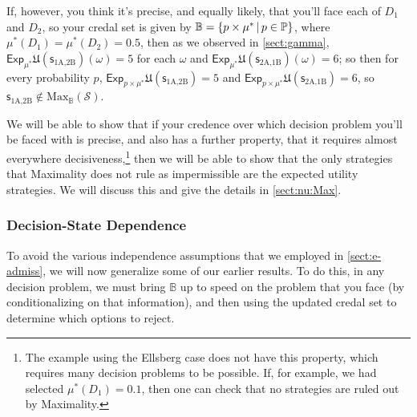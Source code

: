 \documentclass[a4paper]{article}
\newcommand\D{\mathcal{D}}
\newcommand\s{\mathsf{s}}
\renewcommand\P{\mathbb{P}} %
\newcommand\Exp{\mathsf{Exp}}
\newcommand\U{\mathfrak{U}} %
\newcommand\Maximality{\mathrm{Max}}
\newcommand{\IB}{\mathbb{B}}
\newcommand{\IP}{\P}
\renewcommand{\color}[1]{}
\newcommand{\Strategies}{\mathcal{S}}
\newcommand\SetDelimiter[1][]{
	\nonscript\,#1\vert \allowbreak \nonscript\,\mathopen{}}
\providecommand\given{\SetDelimiter}
\newenvironment{CCM rewritten}
{\begingroup\color{blue}} %
{\endgroup}              %
\begin{document}
{If, however, you think it's precise, and equally likely, that you'll face each of $D_1$ and $D_2$, so your credal set is given by $\IB=\{p\times\mu^*\given p\in\IP\}$, where $\mu^*(D_1)=\mu^*(D_2)=0.5$, then as we observed in \cref{sect:gamma}, $\Exp_{\mu^*}\U(\s_{\text{1A,2B}})(\omega)=5$ for each $\omega$ and $\Exp_{\mu^*}\U(\s_{\text{2A,1B}})(\omega)=6$; so then for every probability $p$, $\Exp_{p\times\mu^*}\U(\s_{\text{1A,2B}})=5$ and $\Exp_{p\times\mu^*}\U(\s_{\text{2A,1B}})=6$, so  $\s_{\text{1A,2B}}\notin\Maximality_\IB(\Strategies)$. 

We will be able to show that if your credence over which decision problem you'll be faced with is precise, and also has a further property, that it requires almost everywhere decisiveness,\footnote{The example using the Ellsberg case does not have this property, which requires many decision problems to be possible. If, for example, we had selected $\mu^*(D_1)=0.1$, then one can check that no strategies are ruled out by Maximality.} then we will be able to show that the only strategies that Maximality does not rule as impermissible are the expected utility strategies. We will discuss this and give the details in \cref{sect:nu:Max}.




	\subsubsection{Decision-State Dependence}\label{sect:EAd-dep}
{\color{red} To avoid the various independence assumptions that we employed in \cref{sect:e-admiss}, we will now generalize some of our earlier results. To do this, in any decision problem, we must bring $\IB$ up to speed on the problem that you face (by conditionalizing on that information), and then using the updated credal set to determine which options to reject.}


}
\end{document}
